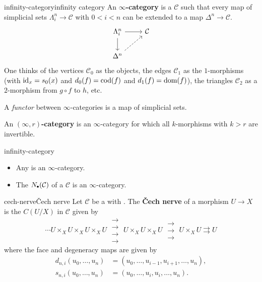 \begin{topic}{infinity-category}{infinity category}
    An \textbf{$\infty$-category} is a  $\mathcal{C}$ such that every map of simplicial sets $\Lambda^n_i \to \mathcal{C}$ with $0 < i < n$ can be extended to a map $\Delta^n \to \mathcal{C}$.
    \[ \begin{tikzcd} \Lambda^n_i \arrow{r} \arrow{d} & \mathcal{C} \\ \Delta^n \arrow[dashed]{ur} & \end{tikzcd} \]
    One thinks of the vertices $\mathcal{C}_0$ as the objects, the edges $\mathcal{C}_1$ as the $1$-morphisms (with $\textup{id}_x = s_0(x)$ and $d_0(f) = \textup{cod}(f)$ and $d_1(f) = \textup{dom}(f)$), the triangles $\mathcal{C}_2$ as a $2$-morphism from $g \circ f$ to $h$, etc.
    
    A \textit{functor} between $\infty$-categories is a map of simplicial sets.
    
    An \textbf{$(\infty, r)$-category} is an $\infty$-category for which all $k$-morphisms with $k > r$ are invertible.
\end{topic}

\begin{example}{infinity-category}
    \begin{itemize}
        \item Any  is an $\infty$-category.
        \item The  $N_\bdot(\mathcal{C})$ of a  $\mathcal{C}$ is an $\infty$-category.
    \end{itemize}
\end{example}

\begin{topic}{cech-nerve}{Čech nerve}
    Let $\mathcal{C}$ be a  with . The \textbf{Čech nerve} of a morphism $U \to X$ is the  $C(U/X)$ in $\mathcal{C}$ given by
    \[ \cdots U \times_X U \times_X U \times_X U \; \substack{\rightarrow \\[-0.9em] \rightarrow \\[-0.9em] \rightarrow \\[-0.9em] \rightarrow} \; U \times_X U \times_X U \; \substack{\rightarrow \\[-0.9em] \rightarrow \\[-0.9em] \rightarrow} \; U \times_X U \rightrightarrows U \]
    where the face and degeneracy maps are given by
    \[ \begin{aligned}
        d_{n, i}(u_0, \ldots, u_n) &= (u_0, \ldots, u_{i - 1}, u_{i + 1}, \ldots, u_n), \\
        s_{n, i}(u_0, \ldots, u_n) &= (u_0, \ldots, u_i, u_i, \ldots, u_n) .
    \end{aligned} \]
\end{topic}

